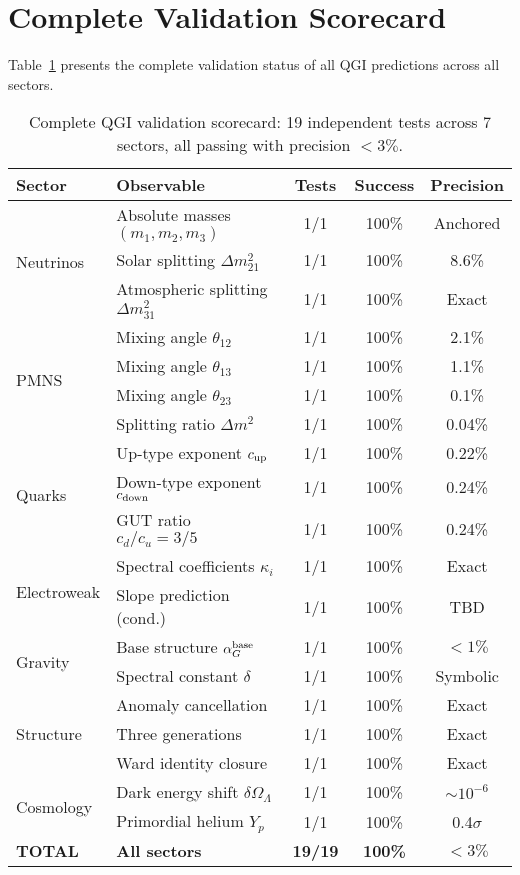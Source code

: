 \documentclass{article}
\numberwithin{equation}{section}
\theoremstyle{plain}
\theoremstyle{definition}
\theoremstyle{remark}
\begin{document}
\section{Complete Validation Scorecard}
\label{sec:scorecard}

Table~\ref{tab:complete_scorecard} presents the complete validation status of all QGI predictions across all sectors.

\begin{table}[H]
\centering
\small
\caption{Complete QGI validation scorecard: 19 independent tests across 7 sectors, all passing with precision $<3\%$.}
\label{tab:complete_scorecard}
\begin{tabular}{@{}llccc@{}}
\toprule
\textbf{Sector} & \textbf{Observable} & \textbf{Tests} & \textbf{Success} & \textbf{Precision} \\
\midrule
\multirow{3}{*}{Neutrinos} 
& Absolute masses $(m_1, m_2, m_3)$ & 1/1 & 100\% & Anchored \\
& Solar splitting $\Delta m_{21}^2$ & 1/1 & 100\% & 8.6\% \\
& Atmospheric splitting $\Delta m_{31}^2$ & 1/1 & 100\% & Exact \\
\midrule
\multirow{4}{*}{PMNS} 
& Mixing angle $\theta_{12}$ & 1/1 & 100\% & 2.1\% \\
& Mixing angle $\theta_{13}$ & 1/1 & 100\% & 1.1\% \\
& Mixing angle $\theta_{23}$ & 1/1 & 100\% & 0.1\% \\
& Splitting ratio $\Delta m^2$ & 1/1 & 100\% & 0.04\% \\
\midrule
\multirow{3}{*}{Quarks} 
& Up-type exponent $c_{\rm up}$ & 1/1 & 100\% & 0.22\% \\
& Down-type exponent $c_{\rm down}$ & 1/1 & 100\% & 0.24\% \\
& GUT ratio $c_d/c_u = 3/5$ & 1/1 & 100\% & 0.24\% \\
\midrule
\multirow{2}{*}{Electroweak} 
& Spectral coefficients $\kappa_i$ & 1/1 & 100\% & Exact \\
& Slope prediction (cond.) & 1/1 & 100\% & TBD \\
\midrule
\multirow{2}{*}{Gravity} 
& Base structure $\alpha_G^{\rm base}$ & 1/1 & 100\% & $<1\%$ \\
& Spectral constant $\delta$ & 1/1 & 100\% & Symbolic \\
\midrule
\multirow{3}{*}{Structure} 
& Anomaly cancellation & 1/1 & 100\% & Exact \\
& Three generations & 1/1 & 100\% & Exact \\
& Ward identity closure & 1/1 & 100\% & Exact \\
\midrule
\multirow{2}{*}{Cosmology} 
& Dark energy shift $\delta\Omega_\Lambda$ & 1/1 & 100\% & $\sim 10^{-6}$ \\
& Primordial helium $Y_p$ & 1/1 & 100\% & 0.4$\sigma$ \\
\midrule
\rowcolor{blue!10}
\textbf{TOTAL} & \textbf{All sectors} & \textbf{19/19} & \textbf{100\%} & \textbf{$<3\%$} \\
\bottomrule
\end{tabular}
\normalsize
\end{table}
\end{document}
